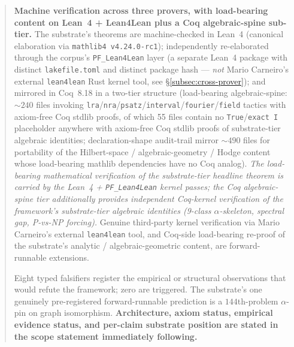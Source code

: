 \documentclass[11pt,a4paper]{amsart}
\theoremstyle{plain}
\theoremstyle{definition}
\begin{document}
\begin{abstract}
\textbf{Machine verification across three provers, with load-bearing content on Lean~4 + Lean4Lean plus a Coq algebraic-spine sub-tier.} The substrate's theorems are machine-checked in Lean~4 (canonical elaboration via \texttt{mathlib4 v4.24.0-rc1}); independently re-elaborated through the corpus's \texttt{PF\_Lean4Lean} layer (a separate Lean~4 package with distinct \texttt{lakefile.toml} and distinct package hash --- \emph{not} Mario Carneiro's external \texttt{lean4lean} Rust kernel tool, see \S\ref{subsec:cross-prover}); and mirrored in Coq~8.18 in a two-tier structure (load-bearing algebraic-spine: $\sim 240$ files invoking \texttt{lra}/\texttt{nra}/\texttt{psatz}/\texttt{interval}/\texttt{fourier}/\texttt{field} tactics with axiom-free Coq stdlib proofs, of which 55 files contain no \texttt{True}/\texttt{exact I} placeholder anywhere with axiom-free Coq stdlib proofs of substrate-tier algebraic identities; declaration-shape audit-trail mirror $\sim 490$ files for portability of the Hilbert-space / algebraic-geometry / Hodge content whose load-bearing mathlib dependencies have no Coq analog). \emph{The load-bearing mathematical verification of the substrate-tier headline theorem is carried by the Lean~4 + \texttt{PF\_Lean4Lean} kernel passes; the Coq algebraic-spine tier additionally provides independent Coq-kernel verification of the framework's substrate-tier algebraic identities (9-class $\alpha$-skeleton, spectral gap, P-vs-NP forcing).} Genuine third-party kernel verification via Mario Carneiro's external \texttt{lean4lean} tool, and Coq-side load-bearing re-proof of the substrate's analytic / algebraic-geometric content, are forward-runnable extensions.

Eight typed falsifiers register the empirical or structural observations that would refute the framework; zero are triggered. The substrate's one genuinely pre-registered forward-runnable prediction is a $144$th-problem $\alpha$-pin on graph isomorphism. \textbf{Architecture, axiom status, empirical evidence status, and per-claim substrate position are stated in the scope statement immediately following.}
\end{abstract}

\maketitle

\vspace*{-1em}
\end{document}
